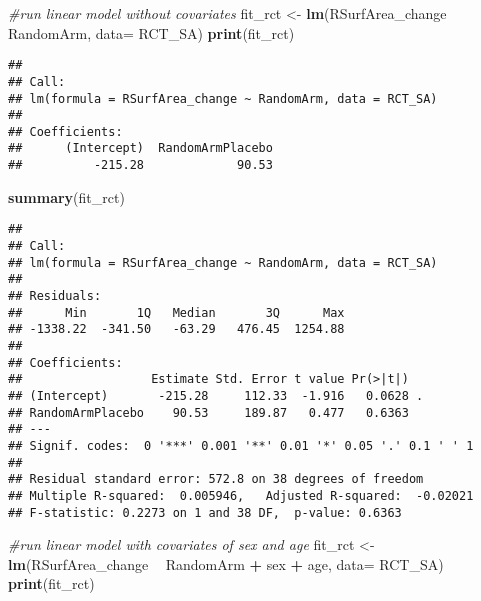 \documentclass[]{article}
\newenvironment{Shaded}{\begin{snugshade}}{\end{snugshade}}
\newcommand{\KeywordTok}[1]{\textcolor[rgb]{0.13,0.29,0.53}{\textbf{#1}}}
\newcommand{\DataTypeTok}[1]{\textcolor[rgb]{0.13,0.29,0.53}{#1}}
\newcommand{\StringTok}[1]{\textcolor[rgb]{0.31,0.60,0.02}{#1}}
\newcommand{\CommentTok}[1]{\textcolor[rgb]{0.56,0.35,0.01}{\textit{#1}}}
\newcommand{\OperatorTok}[1]{\textcolor[rgb]{0.81,0.36,0.00}{\textbf{#1}}}
\newcommand{\NormalTok}[1]{#1}
\theoremstyle{definition}
\theoremstyle{definition}
\theoremstyle{definition}
\theoremstyle{remark}
\begin{document}
\begin{Shaded}
\begin{Highlighting}[]
\CommentTok{#run linear model without covariates}
\NormalTok{  fit_rct <-}\StringTok{ }\KeywordTok{lm}\NormalTok{(RSurfArea_change }\OperatorTok{~}\StringTok{ }\NormalTok{RandomArm, }\DataTypeTok{data=}\NormalTok{ RCT_SA)}
  \KeywordTok{print}\NormalTok{(fit_rct)}
\end{Highlighting}
\end{Shaded}

\begin{verbatim}
## 
## Call:
## lm(formula = RSurfArea_change ~ RandomArm, data = RCT_SA)
## 
## Coefficients:
##      (Intercept)  RandomArmPlacebo  
##          -215.28             90.53
\end{verbatim}

\begin{Shaded}
\begin{Highlighting}[]
  \KeywordTok{summary}\NormalTok{(fit_rct)}
\end{Highlighting}
\end{Shaded}

\begin{verbatim}
## 
## Call:
## lm(formula = RSurfArea_change ~ RandomArm, data = RCT_SA)
## 
## Residuals:
##      Min       1Q   Median       3Q      Max 
## -1338.22  -341.50   -63.29   476.45  1254.88 
## 
## Coefficients:
##                  Estimate Std. Error t value Pr(>|t|)  
## (Intercept)       -215.28     112.33  -1.916   0.0628 .
## RandomArmPlacebo    90.53     189.87   0.477   0.6363  
## ---
## Signif. codes:  0 '***' 0.001 '**' 0.01 '*' 0.05 '.' 0.1 ' ' 1
## 
## Residual standard error: 572.8 on 38 degrees of freedom
## Multiple R-squared:  0.005946,   Adjusted R-squared:  -0.02021 
## F-statistic: 0.2273 on 1 and 38 DF,  p-value: 0.6363
\end{verbatim}

\begin{Shaded}
\begin{Highlighting}[]
\CommentTok{#run linear model with covariates of sex and age}
\NormalTok{  fit_rct <-}\StringTok{ }\KeywordTok{lm}\NormalTok{(RSurfArea_change }\OperatorTok{~}\StringTok{ }\NormalTok{RandomArm }\OperatorTok{+}\StringTok{ }\NormalTok{sex }\OperatorTok{+}\StringTok{ }\NormalTok{age, }\DataTypeTok{data=}\NormalTok{ RCT_SA)}
  \KeywordTok{print}\NormalTok{(fit_rct)}
\end{Highlighting}
\end{Shaded}
\end{document}
